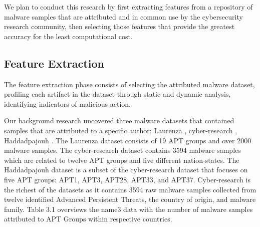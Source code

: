 \documentclass[12pt]{report}
\begin{document}
We plan to conduct this research by first extracting features from a repository of malware samples that are attributed and  in common use by the cybersecurity research community, then selecting those features that provide the greatest accuracy for the least computational cost. 

\subsection{Feature Extraction}

The feature extraction phase consists of selecting the attributed malware dataset, profiling each artifact in the dataset through static and dynamic analysis, identifying indicators of malicious action.     

Our background research uncovered three malware datasets that contained samples that are attributed to a specific author:   Laurenza \cite{laurenza2019daptaset}, cyber-research \cite{APTMalware2022}, Haddadpajouh \cite{haddadpajouh2020mvfcc}.   The Laurenza dataset consists of 19 APT groups and over 2000 malware samples.  The cyber-research dataset contains 3594 malware samples which are related to twelve APT groups and five different nation-states.  The Haddadpajouh dataset is a subset of the cyber-research dataset that focuses on five APT groups: APT1, APT3, APT28, APT33, and APT37.  Cyber-research is the richest of the datasets as it contains 3594 raw malware samples collected from twelve identified Advanced Persistent Threats, the country of origin, and malware family.  Table 3.1 overviews the name3 data with the number of malware samples attributed to APT Groups within respective countries. 
\end{document}
